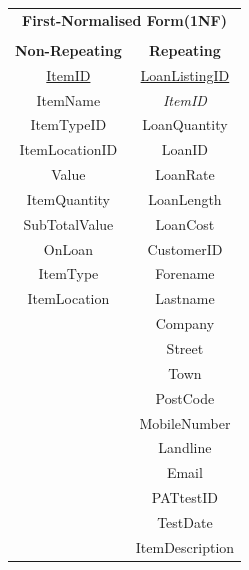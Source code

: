 \begin{center}
    \begin{tabular}{|c|c|}
        \hline
        \multicolumn{2}{|c|}{\textbf{First-Normalised Form(1NF)}} \\
        \multicolumn{2}{|c|}{ }                                   \\ \hline
        \textbf{Non-Repeating} & \textbf{Repeating}               \\ \hline
        \underline{ItemID}     & \underline{LoanListingID}        \\ 
        ItemName               & \emph{ItemID}                    \\ 
        ItemTypeID             & LoanQuantity                     \\ 
        ItemLocationID         & LoanID                           \\
        Value                  & LoanRate                         \\ 
        ItemQuantity           & LoanLength                       \\ 
        SubTotalValue          & LoanCost                         \\ 
        OnLoan                 & CustomerID                       \\ 
        ItemType               & Forename                         \\ 
        ItemLocation           & Lastname                         \\ 
                               & Company                          \\ 
                               & Street                           \\ 
                               & Town                             \\ 
                               & PostCode                         \\ 
                               & MobileNumber                     \\ 
                               & Landline                         \\ 
                               & Email                            \\ 
                               & PATtestID                        \\ 
                               & TestDate                         \\ 
                               & ItemDescription                  \\ 

\end{tabular}
\end{center}
